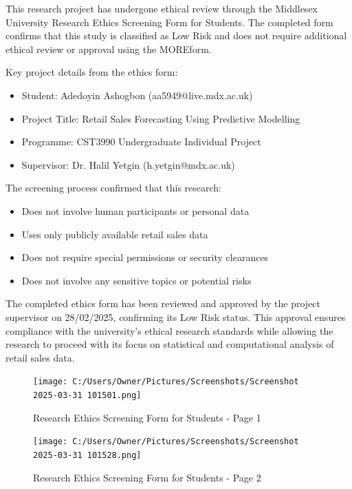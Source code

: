 \documentclass[12pt,a4paper]{report}
\begin{document}
This research project has undergone ethical review through the Middlesex University Research Ethics Screening Form for Students. The completed form confirms that this study is classified as Low Risk and does not require additional ethical review or approval using the MOREform.

Key project details from the ethics form:

\begin{itemize}
    \item Student: Adedoyin Ashogbon (aa5949@live.mdx.ac.uk)
    \item Project Title: Retail Sales Forecasting Using Predictive Modelling
    \item Programme: CST3990 Undergraduate Individual Project
    \item Supervisor: Dr. Halil Yetgin (h.yetgin@mdx.ac.uk)
\end{itemize}

The screening process confirmed that this research:
\begin{itemize}
    \item Does not involve human participants or personal data
    \item Uses only publicly available retail sales data
    \item Does not require special permissions or security clearances
    \item Does not involve any sensitive topics or potential risks
\end{itemize}

The completed ethics form has been reviewed and approved by the project supervisor on 28/02/2025, confirming its Low Risk status. This approval ensures compliance with the university's ethical research standards while allowing the research to proceed with its focus on statistical and computational analysis of retail sales data.

\begin{figure}[htbp]
    \centering
    \texttt{[image: C:/Users/Owner/Pictures/Screenshots/Screenshot 2025-03-31 101501.png]}
    \caption{Research Ethics Screening Form for Students - Page 1}
    \label{fig:ethics_form_1}
\end{figure}

\begin{figure}[htbp]
    \centering
    \texttt{[image: C:/Users/Owner/Pictures/Screenshots/Screenshot 2025-03-31 101528.png]}
    \caption{Research Ethics Screening Form for Students - Page 2}
    \label{fig:ethics_form_2}
\end{figure}
\end{document}
